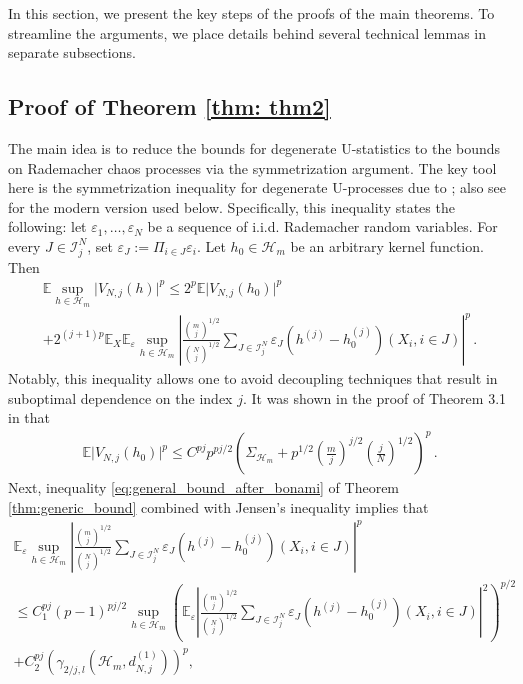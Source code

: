 \documentclass[12pt]{article}
\def\l{\left}
\def\r{\right}
\newcommand{\mb}{\mathbb}
\theoremstyle{thmstyletwo}%
\theoremstyle{thmstylethree}%
\begin{document}
In this section, we present the key steps of the proofs of the main theorems. To streamline the arguments, we place details behind several technical lemmas in separate subsections.

\subsection{Proof of Theorem \ref{thm: thm2}}

The main idea is to reduce the bounds for degenerate U-statistics to the bounds on Rademacher chaos processes via the symmetrization argument. The key tool here is the symmetrization inequality for degenerate U-processes due to  \citet{sherman1994maximal}; also see \citep[Theorem 5.2]{song2019approximating} for the modern version used below. 
Specifically, this inequality states the following: let $\varepsilon_1,\ldots,\varepsilon_N$ be a sequence of i.i.d. Rademacher random variables. For every $J \in \mathcal{I}^N_j$, set 
\(\varepsilon_J := \Pi_{i \in J}\varepsilon_i.\) Let $h_0 \in \mathcal{H}_m$ be an arbitrary kernel function. Then
    \begin{multline*}
        \mb E \sup_{h \in \mathcal{H}_m} \lvert V_{N,j}(h) \rvert ^ p \leq 2^p\mb E \lvert V_{N,j}(h_0) \rvert ^ p \\
        + 2^{(j+1)p} \mb E_X \mb E_\varepsilon \sup_{h \in \mathcal{H}_m} \l\lvert \frac{{m \choose j}^{1/2}}{{N \choose j}^{1/2}} \sum_{J \in \mathcal{I}^N_j} \varepsilon_J \l(h^{(j)} -h_0^{(j)}\r)\l(X_i, i \in J\r)\r\rvert ^ p\,.
    \end{multline*}
    Notably, this inequality allows one to avoid decoupling techniques that result in suboptimal dependence on the index $j$. It was shown in the proof of Theorem 3.1 in \cite{minsker2023u} that
    \begin{align*}
        \mb E \lvert V_{N,j}(h_0) \rvert ^ p \leq C^{pj}p^{pj/2}\l(\Sigma_{\mathcal{H}_m} + p^{1/2}\l(\frac{m}{j}\r)^{j/2}\l(\frac{j}{N}\r)^{1/2}\r)^p\,.
    \end{align*}
    Next, inequality \eqref{eq:general_bound_after_bonami} of Theorem \ref{thm:generic_bound} combined with Jensen's inequality implies that
    \begin{multline}
    \label{eq: thm2-for-rademacher}
        \mb E_\varepsilon \sup_{h \in \mathcal{H}_m} \l\lvert \frac{{m \choose j}^{1/2}}{{N \choose j}^{1/2}} \sum_{J \in \mathcal{I}^N_j} \varepsilon_J \l(h^{(j)} -h_0^{(j)}\r)\l(X_i, i \in J\r)\r\rvert ^ p 
        \\
        \leq C_1^{pj}(p-1)^{pj/2} \sup_{h \in \mathcal{H}_m} \l(\mb E_\varepsilon \l\lvert \frac{{m \choose j}^{1/2}}{{N \choose j}^{1/2}} \sum_{J \in \mathcal{I}^N_j} \varepsilon_J \l(h^{(j)} -h_0^{(j)}\r)\l(X_i, i \in J\r)\r\rvert ^ 2\r) ^ {p/2} 
        \\
        + C_2^{pj}\l(\gamma_{2/j, l}\l(\mathcal{H}_m, d^{(1)}_{N,j}\r)\r)^p,
    \end{multline}
\end{document}
